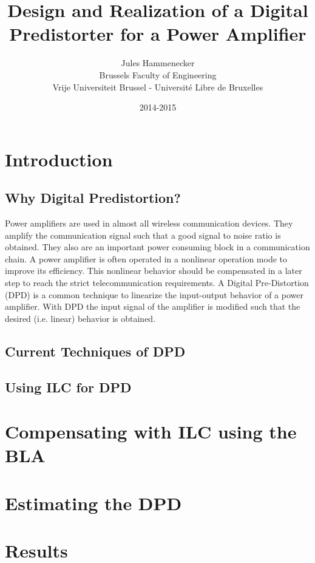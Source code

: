 \documentclass[a4paper]{report}
\begin{document}
\title{Design and Realization of a Digital Predistorter for a Power Amplifier}

\author{Jules Hammenecker \\ Brussels Faculty of Engineering \\ Vrije Universiteit Brussel - Universit\'e Libre de Bruxelles}
\date{2014-2015 }

\maketitle
\begin{abstract}

\end{abstract}

\tableofcontents
\chapter{Introduction}
	\section{Why Digital Predistortion?}
	Power amplifiers are used in almost all wireless communication devices. They amplify the communication signal such that a good signal to noise ratio is obtained. They also are an important power consuming block in a communication chain. A power amplifier is often operated in a nonlinear operation mode to improve its efficiency. This nonlinear behavior should be compensated in a later step to reach the strict telecommunication requirements.
	A Digital Pre-Distortion (DPD) is a common technique to linearize the input-output behavior of a power amplifier. With DPD the input signal of the amplifier is modified such that the desired (i.e. linear) behavior is obtained. 

	\section{Current Techniques of DPD}
	\section{Using ILC for DPD}

\chapter{Compensating with ILC using the BLA}
\chapter{Estimating the DPD}
\chapter{Results}	

\end{document}
